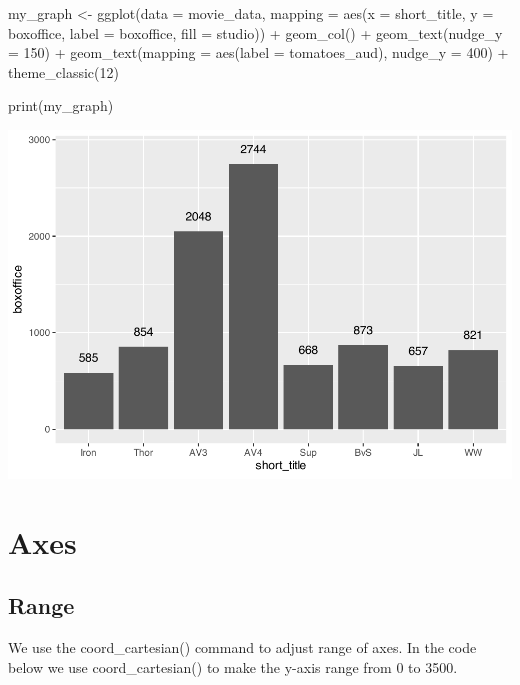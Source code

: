 \documentclass[
]{krantz}
\makeatletter
\newenvironment{Shaded}{\begin{snugshade}}{\end{snugshade}}
\newcommand{\AttributeTok}[1]{\textcolor[rgb]{0.61,0.61,0.61}{#1}}
\newcommand{\DecValTok}[1]{\textcolor[rgb]{0.06,0.06,0.06}{#1}}
\newcommand{\FunctionTok}[1]{\textcolor[rgb]{0,0,0}{#1}}
\newcommand{\NormalTok}[1]{#1}
\newcommand{\OtherTok}[1]{\textcolor[rgb]{0.37,0.37,0.37}{#1}}
\newcommand{\SpecialCharTok}[1]{\textcolor[rgb]{0,0,0}{#1}}
\newenvironment{kframe}{%
\medskip{}
\setlength{\fboxsep}{.8em}
 \def\at@end@of@kframe{}%
 \ifinner\ifhmode%
  \def\at@end@of@kframe{\end{minipage}}%
  \begin{minipage}{\columnwidth}%
 \fi\fi%
 \def\FrameCommand##1{\hskip\@totalleftmargin \hskip-\fboxsep
 \colorbox{shadecolor}{##1}\hskip-\fboxsep
     \hskip-\linewidth \hskip-\@totalleftmargin \hskip\columnwidth}%
 \MakeFramed {\advance\hsize-\width
   \@totalleftmargin\z@ \linewidth\hsize
   \@setminipage}}%
 {\par\unskip\endMakeFramed%
 \at@end@of@kframe}
\renewenvironment{Shaded}{\begin{kframe}}{\end{kframe}}
\makeatother
\begin{document}
\begin{Shaded}
\begin{Highlighting}[]
\NormalTok{my\_graph }\OtherTok{\textless{}{-}} \FunctionTok{ggplot}\NormalTok{(}\AttributeTok{data =}\NormalTok{ movie\_data,}
           \AttributeTok{mapping =} \FunctionTok{aes}\NormalTok{(}\AttributeTok{x =}\NormalTok{ short\_title,}
                         \AttributeTok{y =}\NormalTok{ boxoffice,}
                         \AttributeTok{label =}\NormalTok{ boxoffice, }
                         \AttributeTok{fill =}\NormalTok{ studio)) }\SpecialCharTok{+}
  \FunctionTok{geom\_col}\NormalTok{() }\SpecialCharTok{+}
  \FunctionTok{geom\_text}\NormalTok{(}\AttributeTok{nudge\_y =} \DecValTok{150}\NormalTok{)  }\SpecialCharTok{+}
  \FunctionTok{geom\_text}\NormalTok{(}\AttributeTok{mapping =} \FunctionTok{aes}\NormalTok{(}\AttributeTok{label =}\NormalTok{ tomatoes\_aud), }
            \AttributeTok{nudge\_y =} \DecValTok{400}\NormalTok{) }\SpecialCharTok{+}
  \FunctionTok{theme\_classic}\NormalTok{(}\DecValTok{12}\NormalTok{)}

\FunctionTok{print}\NormalTok{(my\_graph)}
\end{Highlighting}
\end{Shaded}

\includegraphics[width=0.65\linewidth]{bookdown_files/figure-latex/unnamed-chunk-116-1}

\hypertarget{axes}{%
\section{Axes}\label{axes}}

\hypertarget{range}{%
\subsection{Range}\label{range}}

We use the coord\_cartesian() command to adjust range of axes. In the code below we use coord\_cartesian() to make the y-axis range from 0 to 3500.
\end{document}

